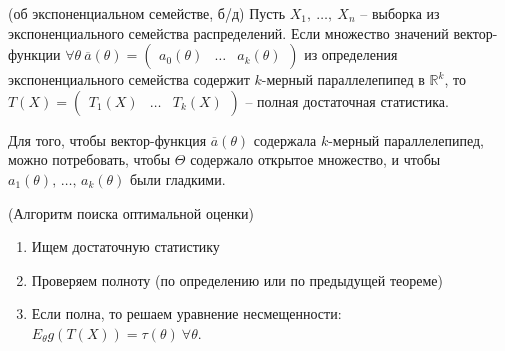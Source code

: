 \begin{theorem}
    (об экспоненциальном семействе, б/д) Пусть $\displaystyle X_{1} ,\ \dotsc ,\ X_{n}$ -- выборка из экспоненциального семейства распределений. Если множество значений вектор-функции $\displaystyle \forall \theta \ \overline{a}( \theta ) =\begin{pmatrix}
    a_{0}( \theta ) & \dotsc  & a_{k}( \theta )
    \end{pmatrix}$ из определения экспоненциального семейства содержит $\displaystyle k$-мерный параллелепипед в $\displaystyle \mathbb{R}^{k}$, то $\displaystyle T( X) =\begin{pmatrix}
    T_{1}( X) & \dotsc  & T_{k}( X)
    \end{pmatrix}$ -- полная достаточная статистика.
\end{theorem}
\begin{note}
    Для того, чтобы вектор-функция $\overline{a}(\theta)$ содержала $k$-мерный параллелепипед, можно потребовать, чтобы $\Theta$ содержало открытое множество, и чтобы $a_1(\theta),\, \ldots,\, a_k(\theta)$ были гладкими.
\end{note}

\begin{proposition}
    (Алгоритм поиска оптимальной оценки)
    \begin{enumerate}
    \item Ищем достаточную статистику
    \item Проверяем полноту (по определению или по предыдущей теореме)
    \item Если полна, то решаем уравнение несмещенности: $\displaystyle E_{\theta } g( T( X)) =\tau ( \theta ) \ \forall \theta $.
    \end{enumerate}
\end{proposition}